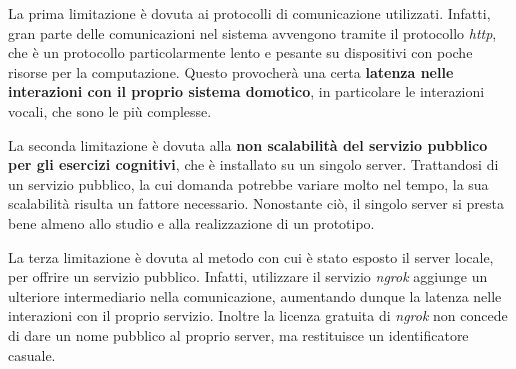 La prima limitazione è dovuta ai protocolli di comunicazione utilizzati.
Infatti, gran parte delle comunicazioni nel sistema avvengono tramite il
protocollo \textit{http}, che è un protocollo particolarmente lento e pesante
su dispositivi con poche risorse per la computazione. Questo provocherà una
certa \textbf{latenza nelle interazioni con il proprio sistema domotico}, in
particolare le interazioni vocali, che sono le più complesse.

La seconda limitazione è dovuta alla \textbf{non scalabilità del servizio
pubblico per gli esercizi cognitivi}, che è installato su un singolo server.
Trattandosi di un servizio pubblico, la cui domanda potrebbe variare molto nel
tempo, la sua scalabilità risulta un fattore necessario. Nonostante ciò, il
singolo server si presta bene almeno allo studio e alla realizzazione di un
prototipo.

La terza limitazione è dovuta al metodo con cui è stato esposto il server
locale, per offrire un servizio pubblico. Infatti, utilizzare il servizio
\textit{ngrok} aggiunge un ulteriore intermediario nella comunicazione,
aumentando dunque la latenza nelle interazioni con il proprio servizio. Inoltre
la licenza gratuita di \textit{ngrok} non concede di dare un nome pubblico al
proprio server, ma restituisce un identificatore casuale.